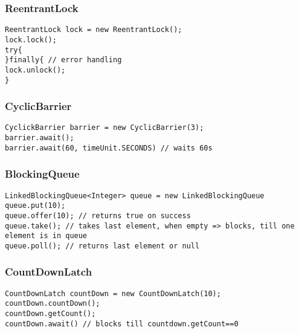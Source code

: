 \subsubsection{ReentrantLock}
\begin{verbatim}
ReentrantLock lock = new ReentrantLock();
lock.lock();
try{
}finally{ // error handling
lock.unlock();
}
\end{verbatim}
\subsubsection{CyclicBarrier}
\begin{verbatim}
CyclickBarrier barrier = new CyclicBarrier(3);
barrier.await();
barrier.await(60, timeUnit.SECONDS) // waits 60s
\end{verbatim}
\subsubsection{BlockingQueue}
\begin{verbatim}
LinkedBlockingQueue<Integer> queue = new LinkedBlockingQueue
queue.put(10);
queue.offer(10); // returns true on success
queue.take(); // takes last element, when empty => blocks, till one element is in queue
queue.poll(); // returns last element or null
\end{verbatim}
\subsubsection{CountDownLatch}
\begin{verbatim}
CountDownLatch countDown = new CountDownLatch(10);
countDown.countDown();
countDown.getCount();
countDown.await() // blocks till countdown.getCount==0
\end{verbatim}















